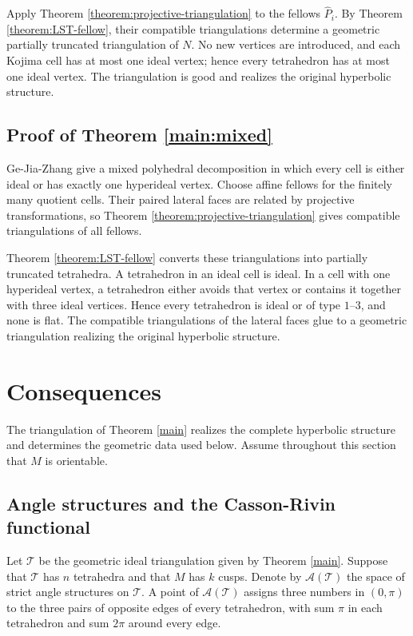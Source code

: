 \documentclass[oneside,a4paper,12pt]{article}
\newcommand{\T}{\mathcal T}
\theoremstyle{plain}
\theoremstyle{definition}
\theoremstyle{remark}
\numberwithin{equation}{section}
\begin{document}
Apply Theorem \ref{theorem:projective-triangulation} to the fellows $\widehat P_i$. By Theorem \ref{theorem:LST-fellow}, their compatible triangulations determine a geometric partially truncated triangulation of $N$. No new vertices are introduced, and each Kojima cell has at most one ideal vertex; hence every tetrahedron has at most one ideal vertex. The triangulation is good and realizes the original hyperbolic structure.

\subsection[Proof of Theorem 1.3]{Proof of Theorem \ref{main:mixed}}
Ge-Jia-Zhang \cite{GJZdecomp} give a mixed polyhedral decomposition in which every cell is either ideal or has exactly one hyperideal vertex. Choose affine fellows for the finitely many quotient cells. Their paired lateral faces are related by projective transformations, so Theorem \ref{theorem:projective-triangulation} gives compatible triangulations of all fellows.

Theorem \ref{theorem:LST-fellow} converts these triangulations into partially truncated tetrahedra. A tetrahedron in an ideal cell is ideal. In a cell with one hyperideal vertex, a tetrahedron either avoids that vertex or contains it together with three ideal vertices. Hence every tetrahedron is ideal or of type $1$--$3$, and none is flat. The compatible triangulations of the lateral faces glue to a geometric triangulation realizing the original hyperbolic structure.

\section{Consequences}\label{section:consequences}
The triangulation of Theorem \ref{main} realizes the complete hyperbolic structure and determines the geometric data used below. Assume throughout this section that $M$ is orientable.


\subsection{Angle structures and the Casson-Rivin functional}
Let $\T$ be the geometric ideal triangulation given by Theorem \ref{main}. Suppose that $\T$ has $n$ tetrahedra and that $M$ has $k$ cusps. Denote by $\mathcal A(\T)$ the space of strict angle structures on $\T$. A point of $\mathcal A(\T)$ assigns three numbers in $(0,\pi)$ to the three pairs of opposite edges of every tetrahedron, with sum $\pi$ in each tetrahedron and sum $2\pi$ around every edge.
\end{document}
